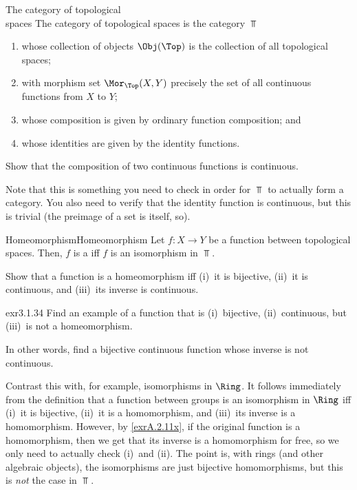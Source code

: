 \begin{exm}{The category of topological \\ spaces}{}
The category of topological spaces is the category $\Top$\index[notation]{$\Top$}
\begin{enumerate}
\item whose collection of objects $\Obj (\Top )$ is the collection of all topological spaces;
\item with morphism set $\Mor _{\Top}(X,Y)$ precisely the set of all continuous functions from $X$ to $Y$;
\item whose composition is given by ordinary function composition; and
\item whose identities are given by the identity functions.
\end{enumerate}
\begin{exr}[breakable=false]{}{}
Show that the composition of two continuous functions is continuous.
\begin{rmk}
Note that this is something you need to check in order for $\Top$ to actually form a category.  You also need to verify that the identity function is continuous, but this is trivial (the preimage of a set is itself, so\textellipsis ).
\end{rmk}
\end{exr}
\end{exm}
\begin{dfn}{Homeomorphism}{Homeomorphism}
Let $f\colon X\rightarrow Y$ be a function between topological spaces.  Then, $f$ is a  iff $f$ is an isomorphism in $\Top$.
\end{dfn}
\begin{exr}{}{}
Show that a function is a homeomorphism iff (i)~it is bijective, (ii)~it is continuous, and (iii)~its inverse is continuous.
\end{exr}
\begin{exr}{}{exr3.1.34}
Find an example of a function that is (i)~bijective, (ii)~continuous, but (iii)~is not a homeomorphism.
\begin{rmk}
In other words, find a bijective continuous function whose inverse is not continuous.
\end{rmk}
\begin{rmk}
Contrast this with, for example, isomorphisms in $\Ring$.  It follows immediately from the definition that a function between groups is an isomorphism in $\Ring$ iff (i)~it is bijective, (ii)~it is a homomorphism, and (iii)~its inverse is a homomorphism.  However, by \cref{exrA.2.11x}, if the original function is a homomorphism, then we get that its inverse is a homomorphism for free, so we only need to actually check (i)~and (ii).  The point is, with rings (and other algebraic objects), the isomorphisms are just bijective homomorphisms, but this is \emph{not} the case in $\Top$.
\end{rmk}
\end{exr}
